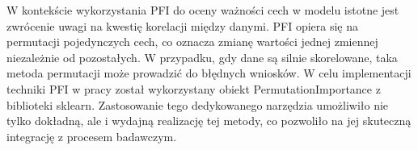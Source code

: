 \documentclass[a4paper,twoside,12pt]{book}
\begin{document}
W kontekście wykorzystania PFI do oceny ważności cech w modelu istotne jest zwrócenie uwagi na kwestię korelacji między danymi. PFI opiera się na permutacji pojedynczych cech, co oznacza zmianę wartości jednej zmiennej niezależnie od pozostałych. W przypadku, gdy dane są silnie skorelowane, taka metoda permutacji może prowadzić do błędnych wniosków. W celu implementacji techniki PFI w pracy został wykorzystany obiekt PermutationImportance z biblioteki sklearn. Zastosowanie tego dedykowanego narzędzia umożliwiło nie tylko dokładną, ale i wydajną realizację tej metody, co pozwoliło na jej skuteczną integrację z procesem badawczym.

\begin{table}[!h]
  \centering
  \caption{Porównianie ważności wejść dla metody PFI}
\end{table}
\end{document}
